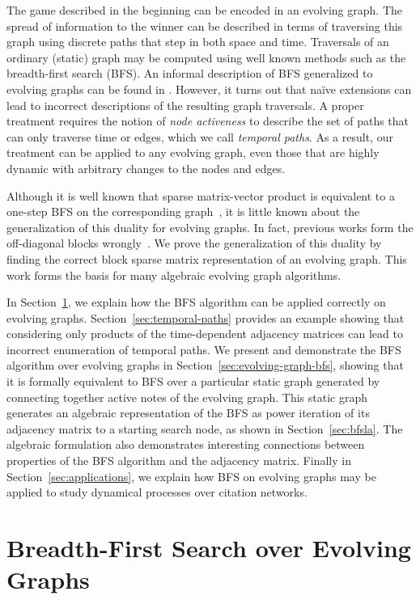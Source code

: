 \documentclass[10pt,conference,compsocconf]{IEEEtran}
\theoremstyle{definition}
\begin{document}
The game described in the beginning can be encoded in an evolving graph.
The spread of information to the winner can be described in terms of traversing
this graph using discrete paths that step in both space and time.
Traversals of an ordinary (static) graph may be computed using well known methods
such as the breadth-first search (BFS). An informal description of BFS generalized
to evolving graphs can be found in \cite{tmml09}.
However, it turns out that na\"ive extensions can lead to incorrect descriptions of
the resulting graph traversals. A proper treatment requires the notion of
\emph{node activeness} to describe the set of paths that can only traverse time
or edges, which we call \textit{temporal paths}.
As a result, our treatment can be applied to any evolving graph, even those that
are highly dynamic with arbitrary changes to the nodes and edges.

Although it is well known that sparse matrix-vector product is equivalent to a 
one-step BFS on the corresponding graph~\cite{kegi11},
it is little known about the generalization of this duality for evolving graphs.
In fact, previous works form the off-diagonal blocks wrongly~\cite{fehi15}. 
We prove the generalization of this duality by finding
the correct block sparse matrix representation of an evolving graph.
This work forms the basis for many algebraic evolving graph algorithms.

In Section~\ref{sec:breadth-first-search}, we explain how the BFS algorithm can be applied correctly on
evolving graphs. Section~\ref{sec:temporal-paths} provides an example showing that considering
only products of the time-dependent adjacency matrices can lead to incorrect enumeration
of temporal paths. We present and demonstrate the BFS algorithm over evolving graphs
in Section~\ref{sec:evolving-graph-bfs}, showing that it is formally equivalent to
BFS over a particular static graph generated by connecting
together active notes of the evolving graph. This static graph generates an algebraic
representation of the BFS as power iteration of its adjacency matrix to a starting
search node, as shown in Section~\ref{sec:bfsla}. The algebraic formulation also
demonstrates interesting connections between properties of the BFS algorithm and
the adjacency matrix. Finally in Section~\ref{sec:applications},
we explain how BFS on evolving graphs may be applied to study dynamical processes
over citation networks.


\section{Breadth-First Search over Evolving Graphs}
\label{sec:breadth-first-search}
\end{document}
